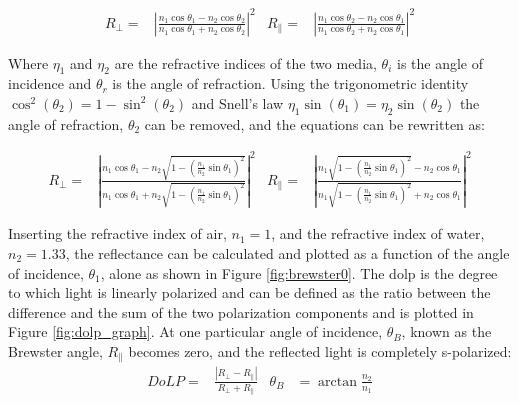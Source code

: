 \begin{align}
    R_\perp =     & \left|{\frac {n_{1}\cos \theta _1-n_{2}\cos \theta _2}{n_{1}\cos \theta _1+n_{2}\cos \theta _2}}\right|^{2}
                  & 
    R_\parallel = & \left|{\frac {n_{1}\cos \theta _2-n_{2}\cos \theta _1}{n_{1}\cos \theta _2+n_{2}\cos \theta _1}}\right|^{2}
\end{align}

Where $\eta_1$ and $\eta_2$ are the refractive indices of the two media,
$\theta_i$ is the angle of incidence and $\theta_r$ is the angle of refraction.
Using the trigonometric identity $ \cos^2{\left(\theta_2 \right)} = 1- \sin^2{\left(\theta_2 \right)}$ and Snell's law $\eta_1 \sin{\left(\theta_1 \right)} = \eta_2 \sin{\left(\theta_2 \right)}$ the angle of refraction, $\theta_2$ can be removed, and the equations can be rewritten as:

\begin{align}
    R_\perp =     & \left|{\frac {n_{1}\cos \theta _1-n_{2}{\sqrt {1-\left({\frac {n_{1}}{n_{2}}}\sin \theta _1\right)^{2}}}}{n_{1}\cos \theta _1+n_{2}{\sqrt {1-\left({\frac {n_{1}}{n_{2}}}\sin \theta _1\right)^{2}}}}}\right|^{2}
                  & 
    R_\parallel = & \left|{\frac {n_{1}{\sqrt {1-\left({\frac {n_{1}}{n_{2}}}\sin \theta _1\right)^{2}}}-n_{2}\cos \theta _1}{n_{1}{\sqrt {1-\left({\frac {n_{1}}{n_{2}}}\sin \theta _1\right)^{2}}}+n_{2}\cos \theta _1}}\right|^{2}
\end{align}


Inserting the refractive index of air, $n_1 = 1$, and the refractive index of water, $n_2 = 1.33$, the reflectance can be calculated and plotted as a function of the angle of incidence, $\theta_1$, alone as shown in Figure \ref{fig:brewster0}.
The \gls{dolp} is the degree to which light is linearly polarized and can be defined as the ratio between the difference and the sum of the two polarization components and is plotted in Figure \ref{fig:dolp_graph}.
At one particular angle of incidence, $\theta_B$, known as the Brewster angle, $R_\parallel$ becomes zero, and the reflected light is completely s-polarized:
\begin{align}
    DoLP= & \frac{\left | R_\perp - R_\parallel \right |}{R_\perp + R_\parallel} & \theta_B & = \arctan{\frac{n_2}{n_1}} 
\end{align}

